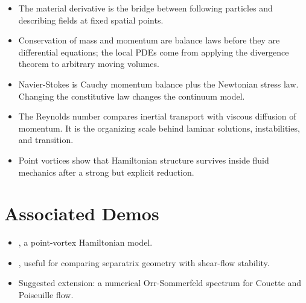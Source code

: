 \begin{itemize}
\item The material derivative is the bridge between following particles and
describing fields at fixed spatial points.
\item Conservation of mass and momentum are balance laws before they are
differential equations; the local PDEs come from applying the divergence theorem
to arbitrary moving volumes.
\item Navier-Stokes is Cauchy momentum balance plus the Newtonian stress law.
Changing the constitutive law changes the continuum model.
\item The Reynolds number compares inertial transport with viscous diffusion of
momentum. It is the organizing scale behind laminar solutions, instabilities,
and transition.
\item Point vortices show that Hamiltonian structure survives inside fluid
mechanics after a strong but explicit reduction.
\end{itemize}

\section{Associated Demos}
\label{sec:fluid-associated-demos}

\begin{itemize}
\item {}, a point-vortex Hamiltonian model.
\item {}, useful for comparing
separatrix geometry with shear-flow stability.
\item Suggested extension: a numerical Orr-Sommerfeld spectrum for Couette and
Poiseuille flow.
\end{itemize}
